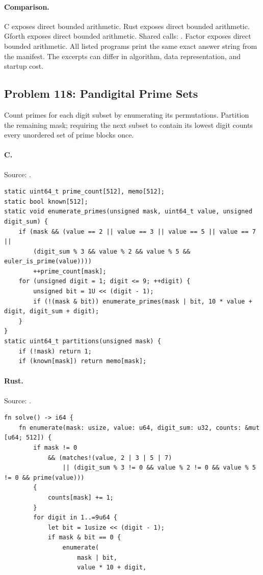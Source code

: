 \paragraph{Comparison.}
C exposes direct bounded arithmetic. Rust exposes direct bounded arithmetic. Gforth exposes direct bounded arithmetic. Shared calls: \texttt{}. Factor exposes direct bounded arithmetic.
All listed programs print the same exact answer string from the manifest. The excerpts can differ in algorithm, data representation, and startup cost.

\subsection{Problem 118: Pandigital Prime Sets}
\label{walkthrough:p118}
Count primes for each digit subset by enumerating its permutations. Partition the remaining mask; requiring the next subset to contain its lowest digit counts every unordered set of prime blocks once.

\paragraph{C.} Source: .
\begin{lstlisting}
static uint64_t prime_count[512], memo[512];
static bool known[512];
static void enumerate_primes(unsigned mask, uint64_t value, unsigned digit_sum) {
    if (mask && (value == 2 || value == 3 || value == 5 || value == 7 ||
        (digit_sum % 3 && value % 2 && value % 5 && euler_is_prime(value))))
        ++prime_count[mask];
    for (unsigned digit = 1; digit <= 9; ++digit) {
        unsigned bit = 1U << (digit - 1);
        if (!(mask & bit)) enumerate_primes(mask | bit, 10 * value + digit, digit_sum + digit);
    }
}
static uint64_t partitions(unsigned mask) {
    if (!mask) return 1;
    if (known[mask]) return memo[mask];
\end{lstlisting}

\paragraph{Rust.} Source: .
\begin{lstlisting}
fn solve() -> i64 {
    fn enumerate(mask: usize, value: u64, digit_sum: u32, counts: &mut [u64; 512]) {
        if mask != 0
            && (matches!(value, 2 | 3 | 5 | 7)
                || (digit_sum % 3 != 0 && value % 2 != 0 && value % 5 != 0 && prime(value)))
        {
            counts[mask] += 1;
        }
        for digit in 1..=9u64 {
            let bit = 1usize << (digit - 1);
            if mask & bit == 0 {
                enumerate(
                    mask | bit,
                    value * 10 + digit,
\end{lstlisting}


